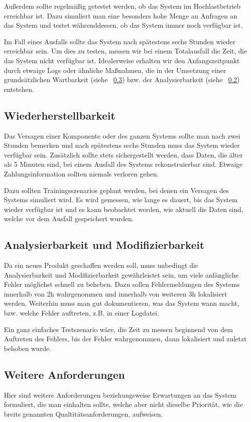 Außerdem sollte regelmäßig getestet werden, ob das System im Hochlastbetrieb erreichbar ist.
Dazu simuliert man eine besonders hohe Menge an Anfragen an das System und testet währenddessen,
ob das System immer noch verfügbar ist.

Im Fall eines Ausfalls sollte das System nach spätestens sechs Stunden wieder erreichbar sein.
Um dies zu testen, messen wir bei einem Totalausfall die Zeit, die das System nicht verfügbar ist.
Idealerweise erhalten wir den Anfangszeitpunkt durch etwaige Logs oder ähnliche Maßnahmen,
die in der Umsetzung einer grundsätzlichen Wartbarkeit (siehe ~\ref{sec:other})
bzw. der Analysierbarkeit (siehe ~\ref{sec:anal}) entstehen.

\subsection{Wiederherstellbarkeit}
Das Versagen einer Komponente oder des ganzen Systems sollte man nach zwei Stunden bemerken
und nach spätestens sechs Stunden muss das System wieder verfügbar sein.
Zusätzlich sollte stets sichergestellt werden, dass Daten, die älter als 5 Minuten sind,
bei einem Ausfall des Systems rekonstruierbar sind.
Etwaige Zahlungsinformation sollten niemals verloren gehen.

Dazu sollten Trainingsszenarios geplant werden, bei denen ein Versagen des Systems simuliert wird.
Es wird gemessen, wie lange es dauert, bis das System wieder verfügbar ist und es kann beobachtet werden,
wie aktuell die Daten sind, welche vor dem Ausfall gespeichert wurden.


\subsection{Analysierbarkeit und Modifizierbarkeit} \label{sec:anal} %
Da ein neues Produkt geschaffen werden soll, muss unbedingt die Analysierbarkeit und Modifizierbarkeit gewährleistet
sein, um viele anfängliche Fehler möglichst schnell zu beheben.
Dazu sollen Fehlermeldungen des Systems innerhalb von 2h wahrgenommen und innerhalb von weiteren 3h lokalisiert werden.
Weiterhin muss man gut dokumentieren, was das System wann macht, bzw. welche Fehler auftreten, z.B. in einer Logdatei.

Ein ganz einfaches Testszenario wäre, die Zeit zu messen beginnend von dem Auftreten des Fehlers,
bis der Fehler wahrgenommen, dann lokalisiert und zuletzt behoben wurde.


\subsection{Weitere Anforderungen} \label{sec:other}
Hier sind weitere Anforderungen beziehungsweise Erwartungen an das System formuliert,
die man einhalten sollte, welche aber nicht dieselbe Priorität, wie die breits genannten Qualtitätsanforderungen, aufweisen.
